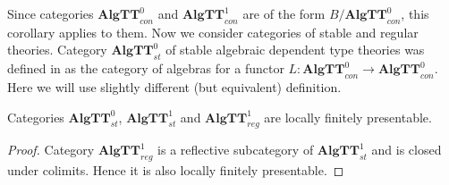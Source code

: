 \documentclass[reqno]{amsart}
\theoremstyle{definition}
\theoremstyle{remark}
\newcommand{\cat}[1]{\mathbf{#1}}
\newcommand{\algtt}{\cat{AlgTT}}
\numberwithin{figure}{section}
\begin{document}
Since categories $\algtt^0_{con}$ and $\algtt^1_{con}$ are of the form $B/\algtt^0_{con}$, this corollary applies to them.
Now we consider categories of stable and regular theories.
Category $\algtt^0_{st}$ of stable algebraic dependent type theories was defined in \cite{alg-tt} as the category of algebras for a functor $L : \algtt^0_{con} \to \algtt^0_{con}$.
Here we will use slightly different (but equivalent) definition.

\begin{cor}
Categories $\algtt^0_{st}$, $\algtt^1_{st}$ and $\algtt^1_{reg}$ are locally finitely presentable.
\end{cor}
\begin{proof}
Category $\algtt^1_{reg}$ is a reflective subcategory of $\algtt^1_{st}$ and is closed under colimits.
Hence it is also locally finitely presentable.
\end{proof}
\end{document}
